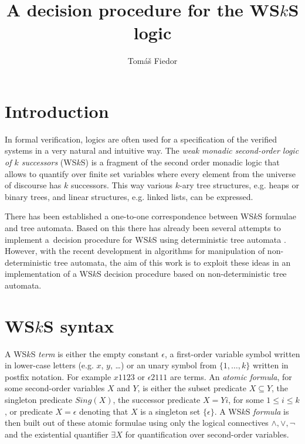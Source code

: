 \documentclass{eeict}
\title{A decision procedure for the WS$k$S logic}
\author{Tomáš Fiedor}
\begin{document}
\maketitle

\section{Introduction}

In formal verification, logics are often used for a specification of the
verified systems in a very natural and intuitive way. The \emph{weak monadic
second-order logic of $k$ successors} (WS$k$S) \cite{wsks} is a fragment of the
second order monadic logic that allows to quantify over finite set variables
where every element from the universe of discourse has $k$ successors. This way
various $k$-ary tree structures, e.g.
heaps or binary trees, and linear structures, e.g. linked lists, can be expressed.

There has been established a
one-to-one correspondence between WS$k$S formulae and tree automata. Based
on this there has already been several attempts to implement a~decision
procedure for WS$k$S using deterministic tree automata \cite{mona}. However,
with the recent development in algorithms for manipulation of
non-deterministic tree automata, the aim of this work is to exploit these ideas
in an implementation of a WS$k$S decision procedure based on non-deterministic
tree automata.

\section{WS$k$S syntax}

A WS$k$S \emph{term} is either the empty constant $\epsilon$, a first-order
variable symbol written in lower-case letters (e.g. $x$, $y$, \ldots) or an
unary symbol from $\{1,\ldots,k\}$ written in postfix notation. For example
$x1123$ or $\epsilon2111$ are terms. An \emph{atomic formula}, for some
second-order variables $X$ and $Y$, is either the subset predicate $X
\subseteq Y$, the singleton predicate $Sing(X)$, the successor predicate $X =
Yi$, for some $1 \leq i \leq k$, or predicate $X
= \epsilon$ denoting that $X$ is a singleton set $\{\epsilon\}$.
A WS$k$S \emph{formula} is then built out of these atomic formulae using only the
logical connectives $\wedge, \vee, \neg$ and the existential quantifier $\exists
X$ for quantification over second-order variables.
\end{document}
